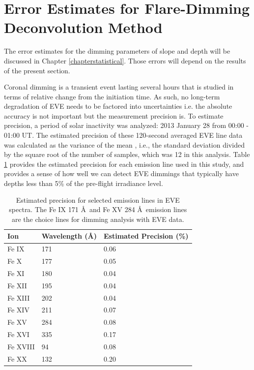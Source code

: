 \section{Error Estimates for Flare-Dimming Deconvolution Method}
\label{sec:deconvolveerrors}
The error estimates for the dimming parameters of slope and depth will be discussed in Chapter \ref{chapterstatistical}. Those errors will depend on the results of the present section. 

Coronal dimming is a transient event lasting several hours that is studied in terms of relative change from the initiation time. As such, no long-term degradation of EVE needs to be factored into uncertainties i.e. the absolute accuracy is not important but the measurement precision is. To estimate precision, a period of solar inactivity was analyzed: 2013 January 28 from 00:00 - 01:00 UT. The estimated precision of these 120-second averaged EVE line data was calculated as the variance of the mean \citep{Bevington2003}, i.e., the standard deviation divided by the square root of the number of samples, which was 12 in this analysis. Table \ref{tab:evelineprecision} provides the estimated precision for each emission line used in this study, and provides a sense of how well we can detect EVE dimmings that typically have depths less than 5\% of the pre-flight irradiance level.

\begin{table}[!h]
    \caption[EVE precision by emission line]{
    Estimated precision for selected emission lines in EVE spectra. The Fe IX 171 \AA\ and Fe XV 284 \AA\ emission lines
    are the choice lines for dimming analysis with EVE data.  
    }
    \begin{center}
    \begin{tabular}{|l|l|l|} \hline
	Ion & Wavelength (\AA) & Estimated Precision (\%) \\ \hline \hline
	Fe IX & 171 & 0.06 \\ \hline
	Fe X & 177 & 0.05  \\ \hline
	Fe XI & 180 & 0.04 \\ \hline
	Fe XII & 195 & 0.04 \\ \hline
	Fe XIII & 202 & 0.04 \\ \hline
	Fe XIV & 211 & 0.07 \\ \hline
	Fe XV & 284 & 0.08 \\ \hline
	Fe XVI & 335 & 0.17 \\ \hline
	Fe XVIII & 94 & 0.08 \\ \hline
	Fe XX & 132 & 0.20 \\ \hline
	\end{tabular}
    \\ \rule{0mm}{5mm}
    \end{center}
    \label{tab:evelineprecision}
\end{table}

